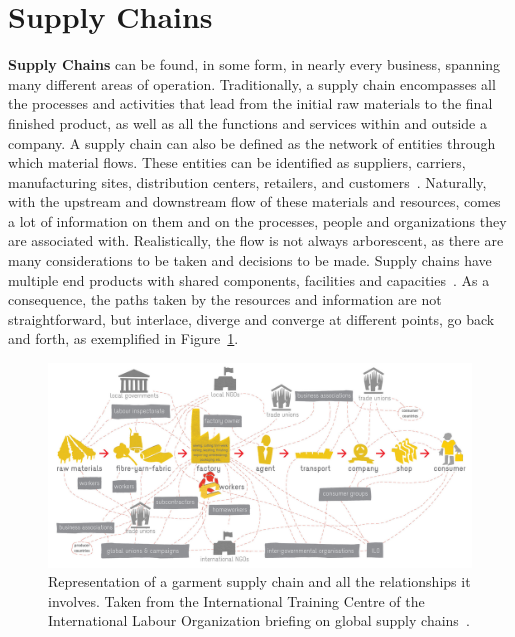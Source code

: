 \section{Supply Chains}
\label{supply_chains}
\textbf{Supply Chains} can be found, in some form, in nearly every business, spanning many different areas of operation. Traditionally, a supply chain encompasses all the processes and activities that lead from the initial raw materials to the final finished product, as well as all the functions and services within and outside a company. A supply chain can also be defined as the network of entities through which material flows. These entities can be identified as suppliers, carriers, manufacturing sites, distribution centers, retailers, and customers~\cite{Lummus2014}. Naturally, with the upstream and downstream flow of these materials and resources, comes a lot of information on them and on the processes, people and organizations they are associated with. Realistically, the  flow is not always arborescent, as there are many considerations to be taken and decisions to be made. Supply chains have multiple end products with shared components, facilities and capacities~\cite{Ganeshan1995}. As a consequence, the paths taken by the resources and information are not straightforward, but interlace, diverge and converge at different points, go back and forth, as exemplified in Figure~\ref{fig:supplychain_complexity}.
  
\begin{figure}[ht]
\centering
\includegraphics[scale=0.18]{media/supplychain_complexity.jpg}
\caption[Representation of a garment supply chain and all the relationships it involves]{Representation of a garment supply chain and all the relationships it involves. Taken from the International Training Centre of the International Labour Organization briefing on global supply chains~\cite{ITCILO2018}.}
\label{fig:supplychain_complexity}
\end{figure}
  
